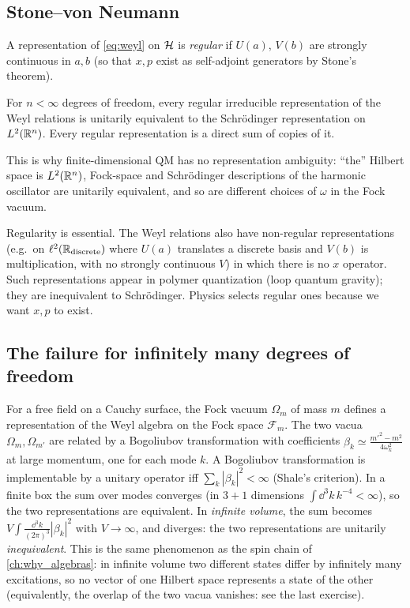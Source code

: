 \subsection{Stone--von Neumann}

A representation of \eqref{eq:weyl} on $\mathcal{H}$ is \emph{regular} if $U(a)$, $V(b)$ are strongly continuous in $a,b$ (so that $x,p$ exist as self-adjoint generators by Stone's theorem).

\begin{theorem}
For $n<\infty$ degrees of freedom, every regular irreducible representation of the Weyl relations is unitarily equivalent to the Schr\"odinger representation on $L^2(\mathbb{R}^n)$. Every regular representation is a direct sum of copies of it.
\end{theorem}

This is why finite-dimensional QM has no representation ambiguity: ``the'' Hilbert space is $L^2(\mathbb{R}^n)$, Fock-space and Schr\"odinger descriptions of the harmonic oscillator are unitarily equivalent, and so are different choices of $\omega$ in the Fock vacuum.

\begin{whatwrong}
Regularity is essential. The Weyl relations also have non-regular representations (e.g.\ on $\ell^2(\mathbb{R}_{\rm discrete})$ where $U(a)$ translates a discrete basis and $V(b)$ is multiplication, with no strongly continuous $V$) in which there is no $x$ operator. Such representations appear in polymer quantization (loop quantum gravity); they are inequivalent to Schr\"odinger. Physics selects regular ones because we want $x,p$ to exist.
\end{whatwrong}

\subsection{The failure for infinitely many degrees of freedom}

For a free field on a Cauchy surface, the Fock vacuum $\Omega_m$ of mass $m$ defines a representation of the Weyl algebra on the Fock space $\mathcal F_m$. The two vacua $\Omega_m,\Omega_{m'}$ are related by a Bogoliubov transformation with coefficients $\beta_k\simeq\frac{m'^2-m^2}{4\omega_k^{2}}$ at large momentum, one for each mode $k$. A Bogoliubov transformation is implementable by a unitary operator iff $\sum_k|\beta_k|^2<\infty$ (Shale's criterion). In a finite box the sum over modes converges (in $3+1$ dimensions $\int\dd^3k\,k^{-4}<\infty$), so the two representations are equivalent. In \emph{infinite volume}, the sum becomes $V\int\frac{\dd^3k}{(2\pi)^3}|\beta_k|^2$ with $V\to\infty$, and diverges: the two representations are unitarily \emph{inequivalent}. This is the same phenomenon as the spin chain of \cref{ch:why_algebras}: in infinite volume two different states differ by infinitely many excitations, so no vector of one Hilbert space represents a state of the other (equivalently, the overlap of the two vacua vanishes: see the last exercise).

